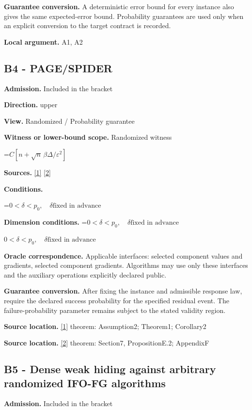 \documentclass[10pt,a4paper]{article}
\newcommand{\AtlasMath}[1]{\par\begingroup\centering\setbox0=\hbox{$\displaystyle #1$}\ifdim\wd0>1.4\linewidth\typeout{ATLAS WIDE FORMULA: \the\wd0}\fi\ifdim\wd0>\linewidth\resizebox{\linewidth}{!}{\box0}\else\box0\fi\par\endgroup}
\newcommand{\AtlasInlineMath}[1]{\begingroup\setbox0=\hbox{$#1$}\ifdim\wd0>.4\linewidth\endgroup\AtlasMath{#1}\else\endgroup$#1$\fi}
\begin{document}
\textbf{Guarantee conversion.} A deterministic error bound for every instance also gives the same expected-error bound. Probability guarantees are used only when an explicit conversion to the target contract is recorded.

\textbf{Local argument.} A1, A2

\subsection{B4 - PAGE/SPIDER}
\textbf{Admission.} Included in the bracket

\textbf{Direction.} upper

\textbf{View.} Randomized / Probability guarantee

\textbf{Witness or lower-bound scope.} Randomized witness

\AtlasMath{C[n+\sqrt n\,\beta\Delta/\varepsilon^2]}
\textbf{Sources.} \href{https://proceedings.mlr.press/v139/li21a/li21a.pdf}{[1]} \href{https://arxiv.org/pdf/2609.00045v3}{[2]}

\textbf{Conditions.} 
\AtlasMath{0<\delta<p_0,\quad\delta\text{fixed in advance}}


\textbf{Dimension conditions.} \AtlasInlineMath{0<\delta<p_0,\quad\delta\text{fixed in advance}}

\textbf{Oracle correspondence.} Applicable interfaces: selected component values and gradients, selected component gradients. Algorithms may use only these interfaces and the auxiliary operations explicitly declared public.

\textbf{Guarantee conversion.} After fixing the instance and admissible response law, require the declared success probability for the specified residual event. The failure-probability parameter remains subject to the stated validity region.

\textbf{Source location.} \href{https://proceedings.mlr.press/v139/li21a/li21a.pdf}{[1]} theorem: Assumption2; Theorem1; Corollary2

\textbf{Source location.} \href{https://arxiv.org/pdf/2609.00045v3}{[2]} theorem: Section7, PropositionE.2; AppendixF

\subsection{B5 - Dense weak hiding against arbitrary randomized IFO-FG algorithms}
\textbf{Admission.} Included in the bracket
\end{document}
